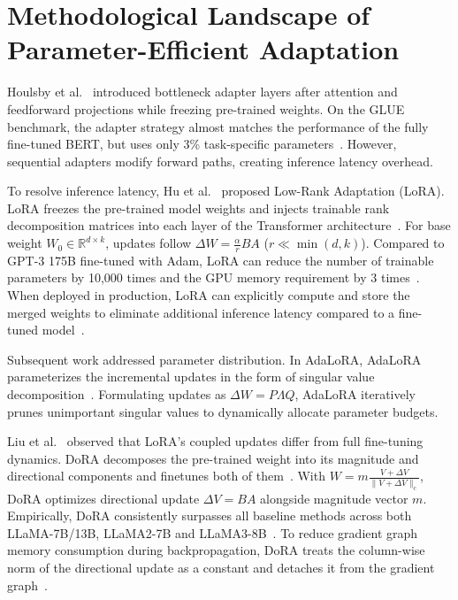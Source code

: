 \documentclass[11pt,a4paper]{article}
\begin{document}
\section{Methodological Landscape of Parameter-Efficient Adaptation}

Houlsby et al.~\cite{houlsby2019parameter} introduced bottleneck adapter layers after attention and feedforward projections while freezing pre-trained weights. On the GLUE benchmark, the adapter strategy almost matches the performance of the fully fine-tuned BERT, but uses only 3\% task-specific parameters~\cite{houlsby2019parameter}. However, sequential adapters modify forward paths, creating inference latency overhead.

To resolve inference latency, Hu et al.~\cite{hu2021lora} proposed Low-Rank Adaptation (LoRA). LoRA freezes the pre-trained model weights and injects trainable rank decomposition matrices into each layer of the Transformer architecture~\cite{hu2021lora}. For base weight $W_0 \in \mathbb{R}^{d \times k}$, updates follow $\Delta W = \frac{\alpha}{r} B A$ ($r \ll \min(d, k)$). Compared to GPT-3 175B fine-tuned with Adam, LoRA can reduce the number of trainable parameters by 10,000 times and the GPU memory requirement by 3 times~\cite{hu2021lora}. When deployed in production, LoRA can explicitly compute and store the merged weights to eliminate additional inference latency compared to a fine-tuned model~\cite{hu2021lora}.

Subsequent work addressed parameter distribution. In AdaLoRA, AdaLoRA parameterizes the incremental updates in the form of singular value decomposition~\cite{zhang2023adalora}. Formulating updates as $\Delta W = P \Lambda Q$, AdaLoRA iteratively prunes unimportant singular values to dynamically allocate parameter budgets.

Liu et al.~\cite{liu2024dora} observed that LoRA's coupled updates differ from full fine-tuning dynamics. DoRA decomposes the pre-trained weight into its magnitude and directional components and finetunes both of them~\cite{liu2024dora}. With $W = m \frac{V + \Delta V}{\lVert V + \Delta V \rVert_c}$, DoRA optimizes directional update $\Delta V = B A$ alongside magnitude vector $m$. Empirically, DoRA consistently surpasses all baseline methods across both LLaMA-7B/13B, LLaMA2-7B and LLaMA3-8B~\cite{liu2024dora}. To reduce gradient graph memory consumption during backpropagation, DoRA treats the column-wise norm of the directional update as a constant and detaches it from the gradient graph~\cite{liu2024dora}.
\end{document}
